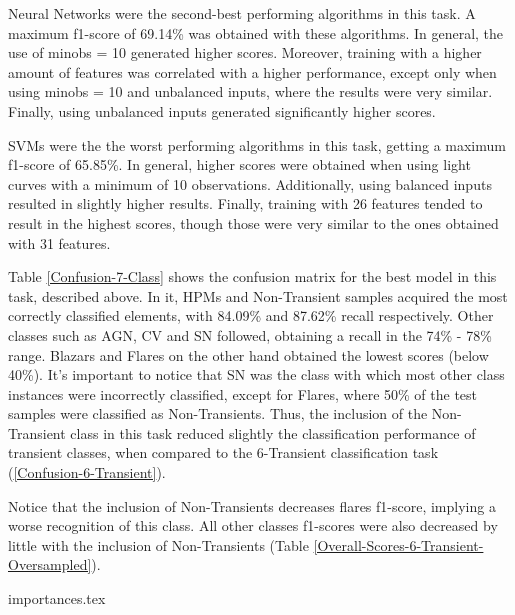Neural Networks were the second-best performing algorithms in this task. A maximum f1-score of 69.14\% was obtained with these algorithms. In general, the use of min\textunderscore obs = 10 generated higher scores. Moreover, training with a higher amount of features was correlated with a higher performance, except only when using min\textunderscore obs = 10 and unbalanced inputs, where the results were very similar. Finally, using unbalanced inputs generated significantly higher scores.

SVMs were the the worst performing algorithms in this task, getting a maximum f1-score of 65.85\%. In general, higher scores were obtained when using light curves with a minimum of 10 observations. Additionally, using balanced inputs resulted in slightly higher results. Finally, training with 26 features tended to result in the highest scores, though those were very similar to the ones obtained with 31 features.

Table \ref{Confusion-7-Class} shows the confusion matrix for the best model in this task, described above. In it, HPMs and Non-Transient samples acquired the most correctly classified elements, with 84.09\% and 87.62\% recall respectively. Other classes such as AGN, CV and SN followed, obtaining a recall in the 74\% - 78\% range. Blazars and Flares on the other hand obtained the lowest scores (below 40\%). It's important to notice that SN was the class with which most other class instances were incorrectly classified, except for Flares, where 50\% of the test samples were classified as Non-Transients. Thus, the inclusion of the Non-Transient class in this task reduced slightly the classification performance of transient classes, when compared to the 6-Transient classification task (\ref{Confusion-6-Transient}).

Notice that the inclusion of Non-Transients decreases flares f1-score, implying a worse recognition of this class. All other classes f1-scores were also decreased by little with the inclusion of Non-Transients (Table \ref{Overall-Scores-6-Transient-Oversampled}).


{importances.tex}

